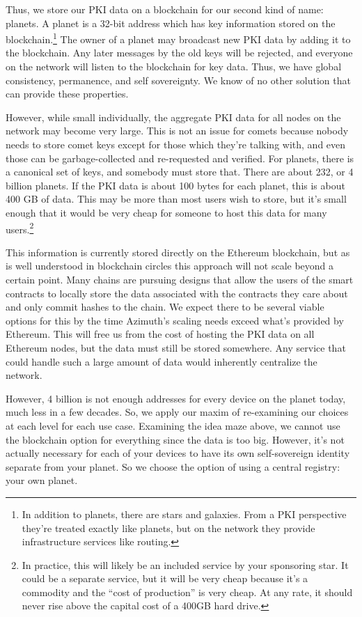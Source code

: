 \documentclass[twoside]{article}
\begin{document}
Thus, we store our PKI data on a blockchain for our second kind of name:
planets. A planet is a 32-bit address which has key information stored
on the blockchain.\footnote{In addition to planets, there are stars and galaxies. From a PKI
perspective they're treated exactly like planets, but on the network
they provide infrastructure services like
routing.} The
owner of a planet may broadcast new PKI data by adding it to the
blockchain. Any later messages by the old keys will be rejected, and
everyone on the network will listen to the blockchain for key data.
Thus, we have global consistency, permanence, and self sovereignty. We
know of no other solution that can provide these properties.

However, while small individually, the aggregate PKI data for all nodes
on the network may become very large. This is not an issue for comets
because nobody needs to store comet keys except for those which they're
talking with, and even those can be garbage-collected and re-requested
and verified. For planets, there is a canonical set of keys, and
somebody must store that. There are about 232, or 4 billion planets. If
the PKI data is about 100 bytes for each planet, this is about 400 GB of
data. This may be more than most users wish to store, but it's small
enough that it would be very cheap for someone to host this data for
many users.\footnote{In practice, this will likely be an included service by your
sponsoring star. It could be a separate service, but it will be very
cheap because it's a commodity and the ``cost of production'' is very
cheap. At any rate, it should never rise above the capital cost of a
400GB hard drive.}

\sloppy
This information is currently stored directly on the Ether\-eum blockchain, but as is well understood in blockchain circles this
approach will not scale beyond a certain point. Many chains are pursuing
designs that allow the users of the smart contracts to locally store the
data associated with the contracts they care about and only commit
hashes to the chain. We expect there to be several viable options for
this by the time Azimuth's scaling needs exceed what's provided by Ethereum. This will free us from the cost of hosting the PKI data on all
Ethereum nodes, but the data must still be stored somewhere. Any service
that could handle such a large amount of data would inherently
centralize the network.

However, 4 billion is not enough addresses for every device on the
planet today, much less in a few decades. So, we apply our maxim of
re-examining our choices at each level for each use case. Examining the
idea maze above, we cannot use the blockchain option for everything
since the data is too big. However, it's not actually necessary for each
of your devices to have its own self-sovereign identity separate from
your planet. So we choose the option of using a central registry: your
own planet.
\end{document}
